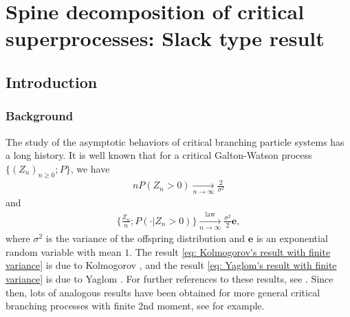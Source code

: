 \chapter{Spine decomposition of critical superprocesses: Slack type result}
\section{Introduction}

\subsection{Background}
	The study of the asymptotic behaviors of critical branching particle systems has a long history.
	It is well known that for a critical Galton-Watson process $\{(Z_n)_{n\geq 0}; P\}$, we have
\begin{align}\label{eq: Kolmogorov's result with finite variance}
	n P(Z_n > 0)
	\xrightarrow[n\to \infty]{} \frac{2}{\sigma^2}
\end{align}
	and
\begin{align}\label{eq: Yaglom's result with finite variance}
	\Big\{ \frac{Z_n}{n}; P(\cdot| Z_n > 0) \Big\}
	\xrightarrow[n \to \infty]{\operatorname{law}} \frac{\sigma^2}{2} \mathbf e,
\end{align}
	where $\sigma^2$ is the variance of the offspring distribution and $\mathbf e$ is an exponential random variable with mean $1$.
	The result \eqref{eq: Kolmogorov's result with finite variance} is due to Kolmogorov \cite{Kolmogorov1938Zur-losung}, and the result \eqref{eq: Yaglom's result with finite variance} is due to Yaglom \cite{Yaglom1947Certain}.
	For further references to these results, see 
	\cite{Harris2002The-theory, KestenNeySpitzer1966The-Galton-Watson}.
	Since then, lots of analogous results have been obtained for more general
	critical branching processes with finite 2nd moment, 
	see \cite{AsmussenHering1983Branching, AthreyaNey1974Functionals, AthreyaNey1972Branching, JoffeSpitzer1967On-multitype} for example.
	

